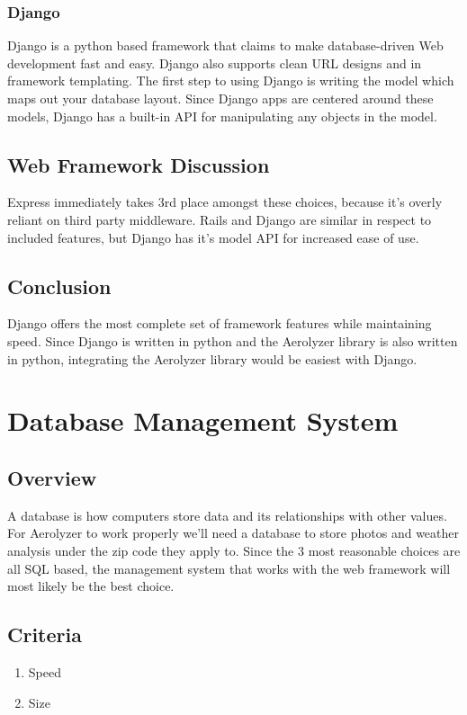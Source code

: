 \documentclass[onecolumn, draftclsnofoot,10pt, compsoc]{IEEEtran}
\begin{document}
\begin{singlespace}
\subsubsection{Django}
Django is a python based framework that claims to make database-driven Web development fast and easy.
Django also supports clean URL designs and in framework templating.
The first step to using Django is writing the model which maps out your database layout.
\cite{DjangoStart}
Since Django apps are centered around these models, Django has a built-in API for manipulating any objects in the model.
\cite{DjangoOver}
\subsection{Web Framework Discussion}
Express immediately takes 3rd place amongst these choices, because it's overly reliant on third party middleware\cite{Express}. Rails and Django are similar in respect to included features, but Django has it's model API for increased ease of use\cite{Rails}\cite{DjangoOver}. 
\subsection{Conclusion}
Django offers the most complete set of framework features while maintaining speed. Since Django is written in python and the Aerolyzer library is also written in python, integrating the Aerolyzer library would be easiest with Django. \cite{DjangoOver}


\section{Database Management System}
\subsection{Overview}
A database is how computers store data and its relationships with other values. For Aerolyzer to work properly we'll need a database to store photos and weather analysis under the zip code they apply to. Since the 3 most reasonable choices are all SQL based, the management system that works with the web framework will most likely be the best choice.
\subsection{Criteria}
\begin{enumerate}
\item Speed
\item Size
\end{enumerate}

\end{singlespace}
\end{document}
